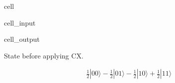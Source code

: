 \documentclass[letterpaper,10pt,english]{jupyterBook}
\begin{document}
\begin{sphinxuseclass}{cell}\begin{sphinxVerbatimInput}

\begin{sphinxuseclass}{cell_input}
\begin{sphinxVerbatim}[commandchars=\\\{\}]
   
\end{sphinxVerbatim}

\end{sphinxuseclass}\end{sphinxVerbatimInput}
\begin{sphinxVerbatimOutput}

\begin{sphinxuseclass}{cell_output}
\begin{sphinxVerbatim}[commandchars=\\\{\}]
State before applying CX.
\end{sphinxVerbatim}
\begin{equation*}
\begin{split}\frac{1}{2} |00\rangle- \frac{1}{2} |01\rangle- \frac{1}{2} |10\rangle+\frac{1}{2} |11\rangle\end{split}
\end{equation*}
\end{sphinxuseclass}\end{sphinxVerbatimOutput}

\end{sphinxuseclass}
\end{document}
